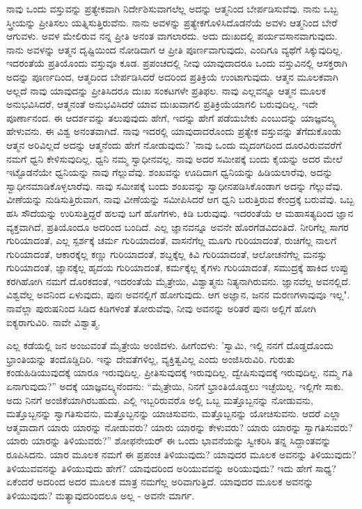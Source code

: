 ನಾವು ಒಂದು ವಸ್ತುವನ್ನು ಪ್ರತ್ಯೇಕವಾಗಿ ನಿರ್ದೇಶಿಸುವಾಗಲೆಲ್ಲ ಅದನ್ನು ಆತ್ಮನಿಂದ ಬೇರ್ಪಡಿಸುವೆವು. ನಾನು ಒಬ್ಬ ಸ್ತ್ರೀಯನ್ನು ಪ್ರೀತಿಸಲು ಯತ್ನಿಸುತ್ತಿರುವೆನು. ನಾನು ಅವಳನ್ನು ಪ್ರತ್ಯೇಕಗೊಳಿಸಿದೊಡನೆಯೆ ಅವಳು ಆತ್ಮನಿಂದ ಬೇರೆ ಆಗುವಳು. ಅವಳ ಮೇಲಿರುವ ನನ್ನ ಪ್ರೀತಿ ಅನಂತ ವಾಗಲಾರದು. ಅದು ದುಃಖದಲ್ಲಿ ಪರ್ಯವಸಾನವಾಗುವುದು. ನಾನು ಅವಳನ್ನು ಆತ್ಮನ ದೃಷ್ಟಿಯಿಂದ ನೋಡಿದಾಗ ಆ ಪ್ರೀತಿ ಪೂರ್ಣವಾಗುವುದು, ಎಂದಿಗೂ ವ್ಯಥೆಗೆ ಸಿಕ್ಕುವುದಿಲ್ಲ. ಇದರಂತೆಯೆ ಪ್ರತಿಯೊಂದು ವಸ್ತುವೂ ಕೂಡ. ಪ್ರಪಂಚದಲ್ಲಿ ನೀವು ಯಾವುದಾದರೂ ಒಂದು ವಸ್ತುವಿನಲ್ಲಿ ಆಸಕ್ತರಾಗಿ ಅದನ್ನು ಪೂರ್ಣದಿಂದ, ಆತ್ಮದಿಂದ ಬೇರ್ಪಡಿಸಿದರೆ ಅದರಿಂದ ಪ್ರತಿಕ್ರಿಯೆ ಉಂಟಾಗುವುದು. ಆತ್ಮನ ಮೂಲಕವಾಗಿ ಅಲ್ಲದೆ ನಾವು ಯಾವುದನ್ನು ಪ್ರೀತಿಸಿದರೂ ದುಃಖ ಸಂಕಟಗಳೇ ಪ್ರತಿಫಲ. ನಾವು ಎಲ್ಲವನ್ನೂ ಆತ್ಮನ ಮೂಲಕ ಅನುಭವಿಸಿದರೆ, ಆತ್ಮನಂತೆ ಅನುಭವಿಸಿದರೆ ಯಾವ ದುಃಖವಾಗಲಿ ಪ್ರತಿಕ್ರಿಯೆಯಾಗಲಿ ಬರುವುದಿಲ್ಲ. ಇದೇ ಪೂರ್ಣಾನಂದ. ಈ ಆದರ್ಶವನ್ನು ತಲುಪುವುದು ಹೇಗೆ, ಇದನ್ನು ಹೇಗೆ ಪಡೆಯಬೇಕು ಎಂಬುದನ್ನು ಯಾಜ್ಞವಲ್ಕ್ಯ ಹೇಳುವನು. ಈ ವಿಶ್ವ ಅನಂತವಾಗಿದೆ. ನಾವು ಇದರಲ್ಲಿ ಯಾವುದಾದರೊಂದು ಪ್ರತ್ಯೇಕ ವಸ್ತುವನ್ನು ತೆಗೆದುಕೊಂಡು ಆತ್ಮನ ಅರಿವಿಲ್ಲದೆ ಅದನ್ನು ಆತ್ಮನೆಂದು ಹೇಗೆ ನೋಡುವುದು? 'ನಾವು ಒಂದು ಮೃದಂಗದಿಂದ ದೂರವಿರುವವರೆಗೆ ನಮಗೆ ಧ್ವನಿ ಕೇಳಿಸುವುದಿಲ್ಲ. ಧ್ವನಿ ನಮ್ಮ ಸ್ವಾಧೀನವಲ್ಲ. ನಾವು ಅದರ ಸಮೀಪಕ್ಕೆ ಬಂದು ಕೈಯನ್ನು ಅದರ ಮೇಲೆ ಇಟ್ಟೊಡನೆಯೇ ಧ್ವನಿಯನ್ನು ನಾವು ಗೆಲ್ಲುವೆವು. ಶಂಖವನ್ನು ಊದಿದಾಗ ಧ್ವನಿಯನ್ನು ಹಿಡಿಯಲಾರೆವು, ಅದನ್ನು ಸ್ವಾಧೀನಮಾಡಿಕೊಳ್ಳಲಾರೆವು. ನಾವು ಸಮೀಪಕ್ಕೆ ಬಂದು ಶಂಖವನ್ನು ಸ್ವಾಧೀನಪಡಿಸಿಕೊಂಡಾಗ ಅದನ್ನು ಗೆಲ್ಲುವೆವು. ವೀಣೆಯನ್ನು ನುಡಿಸುತ್ತಿರುವಾಗ, ನಾವು ವೀಣೆಯನ್ನು ಸಮೀಪಿಸಿದರೆ ಆಗ ಧ್ವನಿ ಬರುತ್ತಿರುವ ಕೇಂದ್ರಕ್ಕೆ ಬರುವೆವು. ಒಬ್ಬ ಹಸಿ ಸೌದೆಯನ್ನು ಉರಿಸುತ್ತಿದ್ದರೆ ಹಲವು ಬಗೆ ಹೊಗೆಗಳು, ಕಿಡಿ ಬರುವುವು. ಇದರಂತೆಯೆ ಆ ಮಹಾಸತ್ಯದಿಂದ ಜ್ಞಾನ ವ್ಯಕ್ತವಾಗಿದೆ, ಪ್ರತಿಯೊಂದೂ ಅದರಿಂದ ಬಂದಿದೆ. ಎಲ್ಲ ಜ್ಞಾನವನ್ನೂ ಅವನೇ ಹೊರಗೆಡವಿದಂತಿದೆ. ನೀರಿಗೆಲ್ಲ ಸಾಗರ ಗುರಿಯಾದಂತೆ, ಎಲ್ಲ ಸ್ಪರ್ಶಕ್ಕೆ ಚರ್ಮ ಗುರಿಯಾದಂತೆ, ವಾಸನೆಗೆಲ್ಲ ಮೂಗು ಗುರಿಯಾದಂತೆ, ರುಚಿಗೆಲ್ಲ ನಾಲಗೆ ಗುರಿಯಾದಂತೆ, ಆಕಾರಕ್ಕೆಲ್ಲ ಕಣ್ಣು ಗುರಿಯಾದಂತೆ, ಶಬ್ದಕ್ಕೆಲ್ಲ ಕಿವಿ ಗುರಿಯಾದಂತೆ, ಆಲೋಚನೆಗೆಲ್ಲ ಮನಸ್ಸು ಗುರಿಯಾದಂತೆ, ಜ್ಞಾನಕ್ಕೆಲ್ಲ ಹೃದಯ ಗುರಿಯಾದಂತೆ, ಕರ್ಮಕ್ಕೆಲ್ಲ ಕೈಗಳು ಗುರಿಯಾದಂತೆ, ಸಮುದ್ರಕ್ಕೆ ಹಾಕಿದ ಉಪ್ಪು ಕರಗಿಹೋಗಿ ನಮಗೆ ದೊರಕದಂತೆ, ಇದರಂತೆಯೆ ಮೈತ್ರೇಯಿ, ವಿಶ್ವಾತ್ಮನು ನಿತ್ಯನಾಗಿರುವನು. ಜ್ಞಾನವೆಲ್ಲ ಅವನಲ್ಲಿದೆ. ವಿಶ್ವವೆಲ್ಲ ಅವನಿಂದ ಏಳುವುದು, ಪುನಃ ಅವನಲ್ಲಿಗೆ ಹೋಗುವುದು. ಆಗ ಅಜ್ಞಾನ, ಜನನ ಮರಣಗಳಾವುವೂ ಇಲ್ಲ". ನಾವೆಲ್ಲಾ ಪುರುಷನಿಂದ ಸಿಡಿದ ಕಿಡಿಗಳಂತೆ ತೋರುವೆವು, ನೀವು ಅವನನ್ನು ಅರಿತರೆ ಪುನಃ ಅಲ್ಲಿಗೆ ಹೋಗಿ ಐಕ್ಯರಾಗುವಿರಿ. ನಾವೇ ವಿಶ್ವಾತ್ಮ.

ಎಲ್ಲ ಕಡೆಯಲ್ಲಿ ಜನ ಅಂಜುವಂತೆ ಮೈತ್ರೇಯಿ ಅಂಜಿದಳು. ಹೀಗೆಂದಳು: 'ಸ್ವಾಮಿ, ಇಲ್ಲಿ ನನಗೆ ದೊಡ್ಡದೊಂದು ಭ್ರಾಂತಿಯನ್ನು ತಂದೊಡ್ಡಿದಿರಿ. ಇನ್ನು ದೇವತೆಗಳಿಲ್ಲ, ವ್ಯಕ್ತಿತ್ವವಿಲ್ಲ ಎಂದು ಅಂಜಿಸಿರುವಿರಿ. ಗುರುತು ಕಂಡುಹಿಡಿಯುವುದಕ್ಕೆ ಯಾರೂ ಇರುವುದಿಲ್ಲ. ಪ್ರೀತಿಸುವುದಕ್ಕೆ ಇರುವುದಿಲ್ಲ. ದ್ವೇಷಿಸುವುದಕ್ಕೆ ಇರುವುದಿಲ್ಲ. ನಮ್ಮ ಗತಿ ಏನಾಗುವುದು?'' ಅದಕ್ಕೆ ಯಾಜ್ಞವಲ್ಕ್ಯನೆಂದನು: “ಮೈತ್ರೇಯಿ, ನಿನಗೆ ಭ್ರಾಂತಿಯೊಡ್ಡಲು ಇಚ್ಛೆಯಿಲ್ಲ. ಇಲ್ಲಿಗೇ ಸಾಕು. ಅದು ನಿನಗೆ ಅಂಜಿಕೆಯಾಗಿರಬಹುದು. ಎಲ್ಲಿ ಇಬ್ಬರಿರುವರೊ ಅಲ್ಲಿ ಒಬ್ಬ ಮತ್ತೊಬ್ಬನನ್ನು ನೋಡುವನು, ಮತ್ತೊಬ್ಬನನ್ನು ಸ್ವಾಗತಿಸುವನು, ಮತ್ತೊಬ್ಬನನ್ನು ಯಾಚಿಸುವನು, ಮತ್ತೊಬ್ಬನನ್ನು ಯೋಚಿಸುವನು. ಆದರೆ ಎಲ್ಲಾ ಆತ್ಮವಾದಾಗ ಯಾರು ಯಾರನ್ನು ನೋಡುವರು? ಯಾರು ಯಾರನ್ನು ಕೇಳುವರು? ಯಾರು ಯಾರನ್ನು ಸ್ವಾಗತಿಸುವರು? ಯಾರು ಯಾರನ್ನು ತಿಳಿಯುವರು?” ಶೋಫನೇಯರ್ ಈ ಒಂದು ಭಾವನೆಯನ್ನು ಸ್ವೀಕರಿಸಿ ತನ್ನ ಸಿದ್ದಾಂತವನ್ನು ರೂಪಿಸಿದನು. ಯಾರ ಮೂಲಕ ನಮಗೆ ಈ ಪ್ರಪಂಚ ತಿಳಿಯುವುದು? ಯಾವುದರ ಮೂಲಕ ಅವನನ್ನು ತಿಳಿಯುವುದು? ತಿಳಿಯುವವನನ್ನು ತಿಳಿಯುವುದು ಹೇಗೆ? ಯಾವುದರಿಂದ ಅರಿಯುವವನ್ನು ಅರಿಯುವುದು? ಇದು ಹೇಗೆ ಸಾಧ್ಯ? ಏಕೆಂದರೆ ಅದರಿಂದ ಅದರ ಮೂಲಕ ಮಾತ್ರ ನಮಗೆಲ್ಲ ಅರಿವಾಗುತ್ತಿದೆ. ಯಾವುದರ ಮೂಲಕ ಅವನನ್ನು ತಿಳಿಯುವುದು? ಮತ್ಯಾವುದರಿಂದಲೂ ಅಲ್ಲ - ಅವನೇ ಮಾರ್ಗ.


